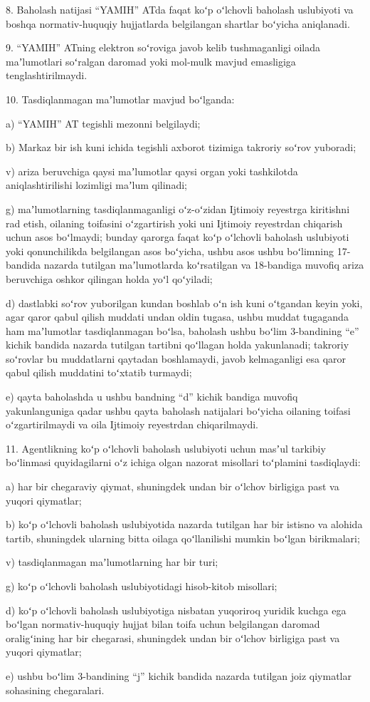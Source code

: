 \documentclass[14pt,a4paper]{extarticle}
\newcommand{\norm}[1]{\par\noindent\hspace*{1.27cm}#1. }
\newcommand{\sub}[1]{\par\noindent\hspace*{1.27cm}#1 }
\begin{document}
\norm{8}Baholash natijasi “YAMIH” ATda faqat koʻp oʻlchovli baholash uslubiyoti va boshqa normativ-huquqiy hujjatlarda belgilangan shartlar boʻyicha aniqlanadi.

\norm{9}“YAMIH” ATning elektron soʻroviga javob kelib tushmaganligi oilada maʼlumotlari soʻralgan daromad yoki mol-mulk mavjud emasligiga tenglashtirilmaydi.

\norm{10}Tasdiqlanmagan maʼlumotlar mavjud boʻlganda:
\sub{a)}“YAMIH” AT tegishli mezonni belgilaydi;
\sub{b)}Markaz bir ish kuni ichida tegishli axborot tizimiga takroriy soʻrov yuboradi;
\sub{v)}ariza beruvchiga qaysi maʼlumotlar qaysi organ yoki tashkilotda aniqlashtirilishi lozimligi maʼlum qilinadi;
\sub{g)}maʼlumotlarning tasdiqlanmaganligi oʻz-oʻzidan Ijtimoiy reyestrga kiritishni rad etish, oilaning toifasini oʻzgartirish yoki uni Ijtimoiy reyestrdan chiqarish uchun asos boʻlmaydi; bunday qarorga faqat koʻp oʻlchovli baholash uslubiyoti yoki qonunchilikda belgilangan asos boʻyicha, ushbu asos ushbu boʻlimning 17-bandida nazarda tutilgan maʼlumotlarda koʻrsatilgan va 18-bandiga muvofiq ariza beruvchiga oshkor qilingan holda yoʻl qoʻyiladi;
\sub{d)}dastlabki soʻrov yuborilgan kundan boshlab oʻn ish kuni oʻtgandan keyin yoki, agar qaror qabul qilish muddati undan oldin tugasa, ushbu muddat tugaganda ham maʼlumotlar tasdiqlanmagan boʻlsa, baholash ushbu boʻlim 3-bandining “e” kichik bandida nazarda tutilgan tartibni qoʻllagan holda yakunlanadi; takroriy soʻrovlar bu muddatlarni qaytadan boshlamaydi, javob kelmaganligi esa qaror qabul qilish muddatini toʻxtatib turmaydi;
\sub{e)}qayta baholashda u ushbu bandning “d” kichik bandiga muvofiq yakunlanguniga qadar ushbu qayta baholash natijalari boʻyicha oilaning toifasi oʻzgartirilmaydi va oila Ijtimoiy reyestrdan chiqarilmaydi.

\norm{11}Agentlikning koʻp oʻlchovli baholash uslubiyoti uchun masʼul tarkibiy boʻlinmasi quyidagilarni oʻz ichiga olgan nazorat misollari toʻplamini tasdiqlaydi:
\sub{a)}har bir chegaraviy qiymat, shuningdek undan bir oʻlchov birligiga past va yuqori qiymatlar;
\sub{b)}koʻp oʻlchovli baholash uslubiyotida nazarda tutilgan har bir istisno va alohida tartib, shuningdek ularning bitta oilaga qoʻllanilishi mumkin boʻlgan birikmalari;
\sub{v)}tasdiqlanmagan maʼlumotlarning har bir turi;
\sub{g)}koʻp oʻlchovli baholash uslubiyotidagi hisob-kitob misollari;
\sub{d)}koʻp oʻlchovli baholash uslubiyotiga nisbatan yuqoriroq yuridik kuchga ega boʻlgan normativ-huquqiy hujjat bilan toifa uchun belgilangan daromad oraligʻining har bir chegarasi, shuningdek undan bir oʻlchov birligiga past va yuqori qiymatlar;
\sub{e)}ushbu boʻlim 3-bandining “j” kichik bandida nazarda tutilgan joiz qiymatlar sohasining chegaralari.
\end{document}
